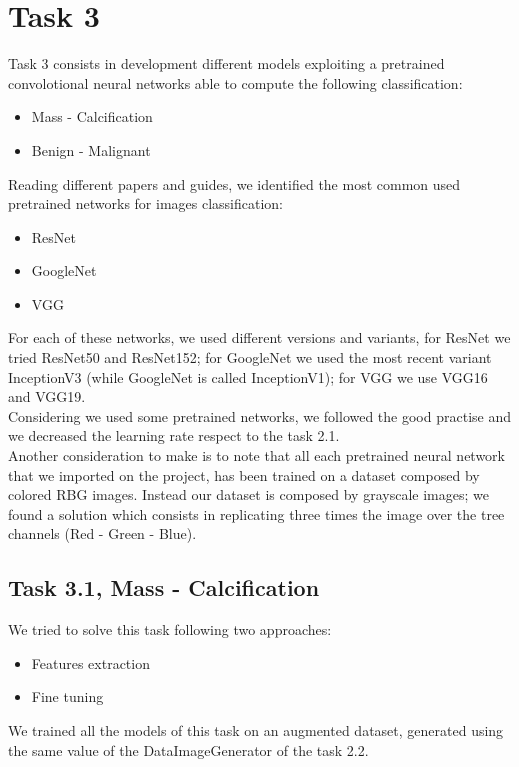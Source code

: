 \documentclass{article}
\begin{document}
\section{Task 3}
Task 3 consists in development different models exploiting a pretrained convolotional neural networks able to compute the following classification:
\begin{itemize}
\item Mass - Calcification
\item Benign - Malignant
\end{itemize}
Reading different papers and guides, we identified the most common used pretrained networks for images classification:
\begin{itemize}
\item ResNet
\item GoogleNet
\item VGG
\end{itemize}
For each of these networks, we used different versions and variants, for ResNet we tried ResNet50 and ResNet152; for GoogleNet we used the most recent variant InceptionV3 (while GoogleNet is called InceptionV1); for VGG we use VGG16 and VGG19.\\
Considering we used some pretrained networks, we followed the good practise and we decreased the learning rate respect to the task 2.1.\\
Another consideration to make is to note that all each pretrained neural network that we imported on the project, has been trained on a dataset composed by colored RBG images. Instead our dataset is composed by grayscale images; we found a solution which consists in replicating three times the image over the tree channels (Red - Green - Blue).



\subsection{Task 3.1, Mass - Calcification}
We tried to solve this task following two approaches:
\begin{itemize}
\item Features extraction
\item Fine tuning
\end{itemize}
We trained all the models of this task on an augmented dataset, generated using the same value of the DataImageGenerator of the task 2.2.
\end{document}
